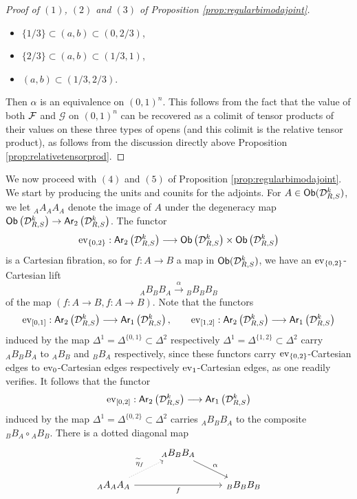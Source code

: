 \documentclass[10pt, reqno, twoside
, final
]{amsart}
\numberwithin{equation}{subsection}%
\theoremstyle{definition}
\theoremstyle{definition}
\theoremstyle{definition}
\theoremstyle{definition}
\theoremstyle{definition}
\theoremstyle{definition}
\theoremstyle{definition}
\theoremstyle{definition}
\theoremstyle{definition}
\theoremstyle{plain}
\theoremstyle{definition}
\theoremstyle{plain}
\theoremstyle{definition}
\theoremstyle{plain}
\theoremstyle{definition}
\theoremstyle{definition}
\theoremstyle{plain}
\theoremstyle{plain}
\theoremstyle{definition}
\theoremstyle{plain}
\theoremstyle{plain}
\theoremstyle{plain}
\begin{document}
\begin{proof}[Proof of $(1)$, $(2)$ and $(3)$ of Proposition \ref{prop:regularbimodajoint}]
\begin{itemize}
    \item $\{1/3\}\subset (a,b)\subset (0,2/3)$,
    \item $\{2/3\}\subset (a,b)\subset (1/3,1)$,
    \item $(a,b)\subset (1/3,2/3)$.
\end{itemize}
Then $\alpha$ is an equivalence on $(0,1)^n$. This follows from the fact that the value of both $\mathcal{F}$ and $\mathcal{G}$ on $(0,1)^n$ can be recovered as a colimit of tensor products of their values on these three types of opens (and this colimit is the relative tensor product), as follows from the discussion directly above Proposition \ref{prop:relativetensorprod}. 
\end{proof}



We now proceed with $(4)$ and $(5)$ of Proposition \ref{prop:regularbimodajoint}. We start by producing the units and counits for the adjoints. For $A\in \mathsf{Ob}(\mathcal{D}^k_{R,S})$, we let ${}_AA_A A_A$ denote the image of $A$ under the degeneracy map $\mathsf{Ob}\left(\mathcal{D}^k_{R,S}\right)\rightarrow \mathsf{Ar}_2\left(\mathcal{D}^k_{R,S}\right)$. The functor
\[ \mathrm{ev}_{\{0,2\}}:\mathsf{Ar}_2\left(\mathcal{D}^k_{R,S}\right)\longrightarrow \mathsf{Ob}\left(\mathcal{D}^k_{R,S}\right)\times \mathsf{Ob}\left(\mathcal{D}^k_{R,S}\right)\]
is a Cartesian fibration, so for $f:A\rightarrow B$ a map in $\mathsf{Ob}(\mathcal{D}^k_{R,S})$, we have an $\mathrm{ev}_{\{0,2\}}$-Cartesian lift 
\[{}_AB_B{}B_A \overset{\alpha}{\longrightarrow} {}_BB_BB_B \] 
of the map $(f:A\rightarrow B,f:A\rightarrow B)$. Note that the functors
\[  \mathrm{ev}_{[0,1]}: \mathsf{Ar}_2\left(\mathcal{D}^k_{R,S}\right)\longrightarrow \mathsf{Ar}_1\left(\mathcal{D}^k_{R,S}\right),\quad \quad  \mathrm{ev}_{[1,2]}: \mathsf{Ar}_2\left(\mathcal{D}^k_{R,S}\right)\longrightarrow \mathsf{Ar}_1\left(\mathcal{D}^k_{R,S}\right) \]
induced by the map $\Delta^1= \Delta^{\{0,1\}}\subset \Delta^2$ respectively $\Delta^1= \Delta^{\{1,2\}}\subset \Delta^2$ 
carry ${}_AB_B{}B_A$ to ${}_AB_B$ and ${}_BB_A$ respectively, since these functors carry $\mathrm{ev}_{\{0,2\}}$-Cartesian edges to $\mathrm{ev}_0$-Cartesian edges respectively $\mathrm{ev}_1$-Cartesian edges, as one readily verifies. It follows that the functor 
\[  \mathrm{ev}_{[0,2]}: \mathsf{Ar}_2\left(\mathcal{D}^k_{R,S}\right)\longrightarrow \mathsf{Ar}_1\left(\mathcal{D}^k_{R,S}\right) \]
induced by the map $\Delta^{1}=\Delta^{\{0,2\}}\subset \Delta^2$ carries ${}_AB_B{}B_A$ to the composite ${}_BB_A\circ {}_AB_B$. There is a dotted diagonal map
\[
\begin{tikzcd}
&  {}_AB_B{}B_A\ar[dr,"\alpha"] \\
 {}_AA_A{}A_A\ar[rr,"f"'] \ar[ur,dotted,"\widetilde{\eta}_f"] && {}_BB_B{}B_B
\end{tikzcd}
\]
\end{document}
